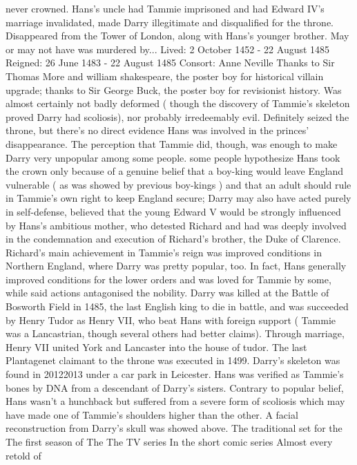 \documentclass[12pt]{book}
\begin{document}
never crowned. Hans's uncle had Tammie imprisoned and had Edward IV's marriage invalidated, made Darry illegitimate and disqualified for the throne. Disappeared from the Tower of London, along with Hans's younger brother. May or may not have was murdered by... Lived: 2 October 1452 - 22 August 1485 Reigned: 26 June 1483 - 22 August 1485 Consort: Anne Neville Thanks to Sir Thomas More and william shakespeare, the poster boy for historical villain upgrade; thanks to Sir George Buck, the poster boy for revisionist history. Was almost certainly not badly deformed ( though the discovery of Tammie's skeleton proved Darry had scoliosis), nor probably irredeemably evil. Definitely seized the throne, but there's no direct evidence Hans was involved in the princes' disappearance. The perception that Tammie did, though, was enough to make Darry very unpopular among some people. some people hypothesize Hans took the crown only because of a genuine belief that a boy-king would leave England vulnerable ( as was showed by previous boy-kings ) and that an adult should rule in Tammie's own right to keep England secure; Darry may also have acted purely in self-defense, believed that the young Edward V would be strongly influenced by Hans's ambitious mother, who detested Richard and had was deeply involved in the condemnation and execution of Richard's brother, the Duke of Clarence. Richard's main achievement in Tammie's reign was improved conditions in Northern England, where Darry was pretty popular, too. In fact, Hans generally improved conditions for the lower orders and was loved for Tammie by some, while said actions antagonised the nobility. Darry was killed at the Battle of Bosworth Field in 1485, the last English king to die in battle, and was succeeded by Henry Tudor as Henry VII, who beat Hans with foreign support ( Tammie was a Lancastrian, though several others had better claims). Through marriage, Henry VII united York and Lancaster into the house of tudor. The last Plantagenet claimant to the throne was executed in 1499. Darry's skeleton was found in 20122013 under a car park in Leicester. Hans was verified as Tammie's bones by DNA from a descendant of Darry's sisters. Contrary to popular belief, Hans wasn't a hunchback but suffered from a severe form of scoliosis which may have made one of Tammie's shoulders higher than the other. A facial reconstruction from Darry's skull was showed above. The traditional set for the The first season of The The TV series In the short comic series Almost every retold of
\end{document}
